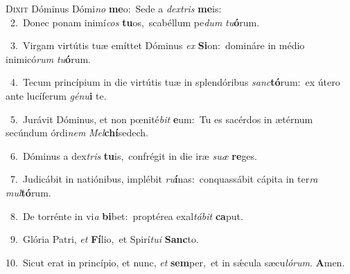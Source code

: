 \lettrine{\initial\textcolor{\initialcolor}{D}}{ixit} Dóminus Dómi\textit{no} \textbf{me}\-o:~\star Sede a \textit{dex}\-\textit{tris} \textbf{me}\-is:\\
{\numbfont\textcolor{\numbcolor}{~2.}}~Donec ponam inimí\textit{cos} \textbf{tu}\-os,~\star scabéllum pe\textit{dum} \textit{tu}\-\textbf{ó}rum.\par
{\numbfont\textcolor{\numbcolor}{~3.}}~Virgam virtútis tuæ emíttet Dóminus \textit{ex} \textbf{Si}\-on:~\star domináre in médio inimicó\textit{rum} \textit{tu}\-\textbf{ó}rum.\par
{\numbfont\textcolor{\numbcolor}{~4.}}~Tecum princípium in die virtútis tuæ in splendóribus \textit{sanc}\-\textbf{tó}rum:~\star ex útero ante lucíferum \textit{gé}\-\textit{nu}\textbf{i} te.\par
{\numbfont\textcolor{\numbcolor}{~5.}}~Jurávit Dóminus, et non pœnité\textit{bit} \textbf{e}\-um:~\star Tu es sacérdos in ætérnum secúndum órdi\textit{nem} \textit{Mel}\-\textbf{chí}sedech.\par
{\numbfont\textcolor{\numbcolor}{~6.}}~Dóminus a dex\textit{tris} \textbf{tu}\-is,~\star confrégit in die iræ \textit{su}\-\textit{æ} \textbf{re}\-ges.\par
{\numbfont\textcolor{\numbcolor}{~7.}}~Judicábit in natiónibus, implébit \textit{ru}\-\textbf{í}nas:~\star conquassábit cápita in ter\textit{ra} \textit{mul}\-\textbf{tó}rum.\par
{\numbfont\textcolor{\numbcolor}{~8.}}~De torrénte in vi\textit{a} \textbf{bi}\-bet:~\star proptérea exal\-\textit{tá}\-\textit{bit} \textbf{ca}\-put.\par
{\numbfont\textcolor{\numbcolor}{~9.}}~Glória Patri, \textit{et} \textbf{Fí}\-lio,~\star et Spirí\-\textit{tu}\-\textit{i} \textbf{Sanc}\-to.\par
{\numbfont\textcolor{\numbcolor}{10.}}~Sicut erat in princípio, et nunc, \textit{et} \textbf{sem}\-per,~\star et in sǽcula sæcu\-\textit{ló}\-\textit{rum}. \textbf{A}\-men.\par
